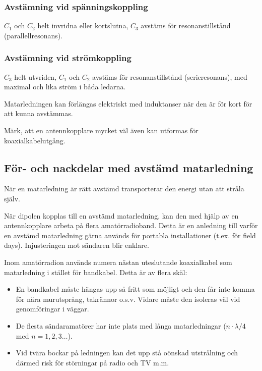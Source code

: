 \subsubsection{Avstämning vid spänningskoppling}

\(C_1\) och \(C_2\) helt invridna eller kortslutna, \(C_3\) avstäms
för resonanstillstånd (parallellresonans).

\subsubsection{Avstämning vid strömkoppling}

\(C_3\) helt utvriden, \(C_1\) och \(C_2\) avstäms för
resonanstillstånd (serieresonans), med maximal och lika ström i båda
ledarna.

Matarledningen kan förlängas elektriskt med induktanser när den är för
kort för att kunna avstämmas.

Märk, att en antennkopplare mycket väl även kan utformas för
koaxialkabelutgång.

\subsection{För- och nackdelar med avstämd matarledning}

När en matarledning är rätt avstämd transporterar den energi utan att
stråla själv.

När dipolen kopplas till en avstämd matarledning, kan den med hjälp av
en antennkopplare arbeta på flera amatörradioband. Detta är en
anledning till varför en avstämd matarledning gärna används för
portabla installationer (t.ex. för field days). Injusteringen mot
sändaren blir enklare.

Inom amatörradion används numera nästan uteslutande koaxialkabel som
matarledning i stället för bandkabel. Detta är av flera skäl:
\begin{itemize}
\item En bandkabel måste hängas upp så fritt som möjligt och den får
  inte komma för nära murutsprång, takrännor o.s.v. Vidare måste den
  isoleras väl vid genomföringar i väggar.
\item De flesta sändaramatörer har inte plats med långa matarledningar
  (\(n\cdot\lambda/4\) med \(n = 1, 2, 3 \dots\)).
\item Vid tvära bockar på ledningen kan det upp stå oönskad
  utstrålning och därmed risk för störningar på radio och TV m.m.
\end{itemize}
